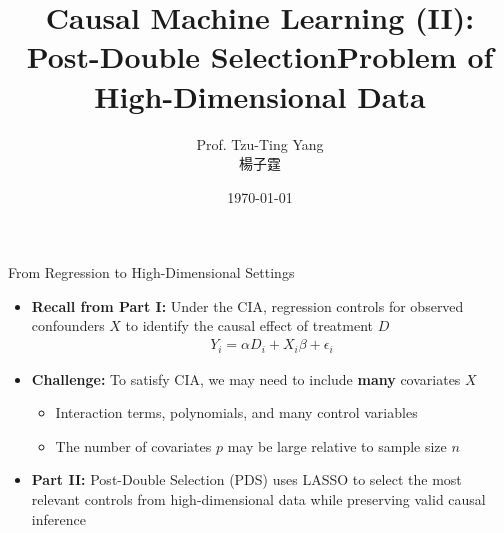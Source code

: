 \documentclass[hyperref={pdfpagelabels=false}]{beamer}
\title[]  
{Causal Machine Learning (II): Post-Double Selection}
\author 
{Prof. Tzu-Ting Yang  \\ 楊子霆}
\institute{Institute of Economics, Academia Sinica  \\ 中央研究院經濟研究所}
\date
{\today}
\begin{document}
	
	
	\begin{frame}{}
		\titlepage
	\end{frame}
	



\title[]  
{Problem of High-Dimensional Data}


\author 
{}

\institute{}






\date
{}


\begin{frame}{}
	\titlepage
\end{frame}




	
\begin{frame}{From Regression to High-Dimensional Settings}
		\begin{itemize}
			\item \textbf{Recall from Part I:} Under the CIA, regression controls for observed confounders $X$ to identify the causal effect of treatment $D$
			\begin{eqnarray*}
				Y_{i} = \alpha D_{i} + X_{i}\beta + \epsilon_{i}
			\end{eqnarray*}
			\vspace{0.2cm}
			\item \textbf{Challenge:} To satisfy CIA, we may need to include \textbf{many} covariates $X$
			\vspace{0.2cm}
			\begin{itemize}
				\item Interaction terms, polynomials, and many control variables
				\vspace{0.2cm}
				\item The number of covariates $p$ may be large relative to sample size $n$
			\end{itemize}
			\vspace{0.3cm}
			\item \textbf{Part II:} Post-Double Selection (PDS) uses LASSO to select the most relevant controls from high-dimensional data while preserving valid causal inference
		\end{itemize}
	\end{frame}
	
\end{document}
